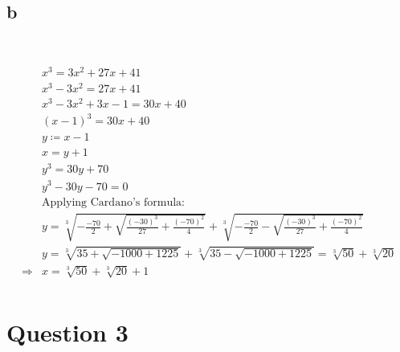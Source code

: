 \documentclass{article}
\begin{document}
~

\subsection*{b}

~

\begin{align*}
    &x^3=3x^2+27x+41\\
    &x^3-3x^2=27x+41\\
    &x^3-3x^2+3x-1=30x+40\\
    &(x-1)^3=30x+40\\
    &y\coloneqq x-1\\
    &x=y+1\\
    &y^3=30y+70\\
    &y^3-30y-70=0\\
    &\text{Applying Cardano's formula}:\\
    &y=\sqrt[3]{-\frac{-70}{2}+\sqrt{\frac{(-30)^3}{27}+\frac{(-70)^2}{4}}}+\sqrt[3]{-\frac{-70}{2}-\sqrt{\frac{(-30)^3}{27}+\frac{(-70)^2}{4}}}\\
    &y=\sqrt[3]{35+\sqrt{-1000+1225}}+\sqrt[3]{35-\sqrt{-1000+1225}}=\sqrt[3]{50}+\sqrt[3]{20}\\
    \Rightarrow&x=\sqrt[3]{50}+\sqrt[3]{20}+1\\
\end{align*}

\newpage

\section*{Question 3}

~
\end{document}

